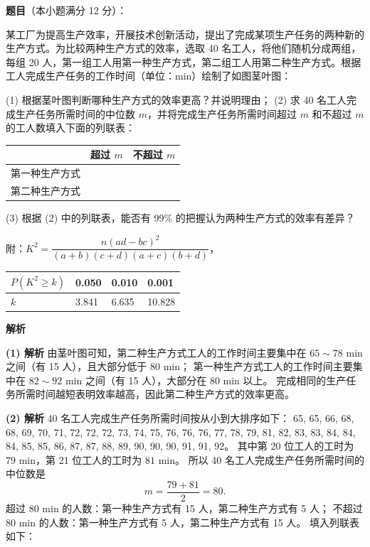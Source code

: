 \begin{answer}

\textbf{题目}（本小题满分 12 分）：

某工厂为提高生产效率，开展技术创新活动，提出了完成某项生产任务的两种新的生产方式。为比较两种生产方式的效率，选取 40 名工人，将他们随机分成两组，每组 20 人，第一组工人用第一种生产方式，第二组工人用第二种生产方式。根据工人完成生产任务的工作时间（单位：min）绘制了如图茎叶图：
\nopagebreak[4]
\begin{center}\end{center}
\nopagebreak[4]
(1) 根据茎叶图判断哪种生产方式的效率更高？并说明理由；
(2) 求 40 名工人完成生产任务所需时间的中位数 $m$，并将完成生产任务所需时间超过 $m$ 和不超过 $m$ 的工人数填入下面的列联表：

\begin{center}
\begin{tabular}{lll}
\toprule
 & 超过 $m$ & 不超过 $m$ \\
\midrule
第一种生产方式 &  &  \\
第二种生产方式 &  &  \\
\bottomrule
\end{tabular}
\end{center}

(3) 根据 (2) 中的列联表，能否有 99\% 的把握认为两种生产方式的效率有差异？

附：$K^2 = \dfrac{n(ad - bc)^2}{(a + b)(c + d)(a + c)(b + d)}$，

\begin{center}
\begin{tabular}{llll}
\toprule
$P(K^2 \geqslant k)$ & 0.050 & 0.010 & 0.001 \\
\midrule
$k$ & 3.841 & 6.635 & 10.828 \\
\bottomrule
\end{tabular}
\end{center}

\textbf{解析}

\textbf{(1) 解析} 由茎叶图可知，第二种生产方式工人的工作时间主要集中在 $65\sim 78\text{ min}$ 之间（有 15 人），且大部分低于 $80\text{ min}$；
第一种生产方式工人的工作时间主要集中在 $82\sim 92\text{ min}$ 之间（有 15 人），大部分在 $80\text{ min}$ 以上。
完成相同的生产任务所需时间越短表明效率越高，因此第二种生产方式的效率更高。

\textbf{(2) 解析} 40 名工人完成生产任务所需时间按从小到大排序如下：
65, 65, 66, 68, 68, 69, 70, 71, 72, 72, 72, 73, 74, 75, 76, 76, 76, 77, 78, 79, 81, 82, 83, 83, 84, 84, 84, 85, 85, 86, 87, 87, 88, 89, 90, 90, 90, 91, 91, 92。
其中第 20 位工人的工时为 $79\text{ min}$，第 21 位工人的工时为 $81\text{ min}$。
所以 40 名工人完成生产任务所需时间的中位数是
\nopagebreak[4]
\[m = \dfrac{79 + 81}{2} = 80.\]
超过 $80\text{ min}$ 的人数：第一种生产方式有 15 人，第二种生产方式有 5 人；
不超过 $80\text{ min}$ 的人数：第一种生产方式有 5 人，第二种生产方式有 15 人。
填入列联表如下：


\end{answer}

